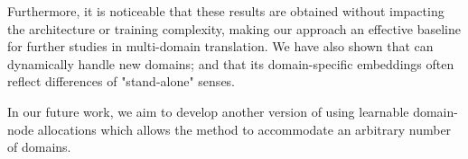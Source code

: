 Furthermore, it is noticeable that these results are obtained without impacting the architecture or training complexity, making our approach an effective baseline for further studies in multi-domain translation. We have also shown that  can dynamically handle new domains; and that its domain-specific embeddings often reflect differences of "stand-alone" senses. 

In our future work, we aim to develop another version of  using learnable domain-node allocations which allows the method to accommodate an arbitrary number of domains.


